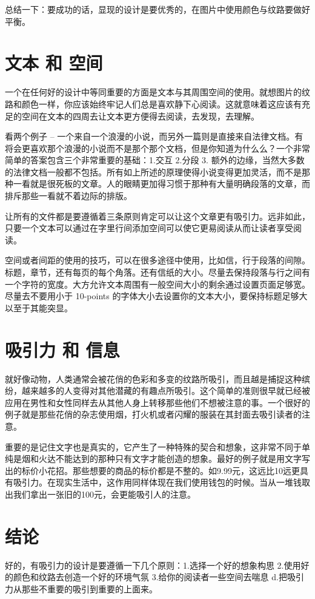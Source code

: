 总结一下：要成功的话，显现的设计是要优秀的，在图片中使用颜色与纹路要做好平衡。

\section*{文本 和 空间}

一个在任何好的设计中等同重要的方面是文本与其周围空间的使用。就想图片的纹路和颜色一样，你应该始终牢记人们总是喜欢静下心阅读。这就意味着这应该有充足的空间在文本的四周去让文本更方便得去阅读，去发现，去理解。

看两个例子 -- 一个来自一个浪漫的小说，而另外一篇则是直接来自法律文档。有将会更喜欢那个浪漫的小说而不是那个那个文档，但是你知道为什么么？一个非常简单的答案包含三个非常重要的基础：1.交互 2.分段 3. 额外的边缘，当然大多数的法律文档一般都不包括。所有如上所述的原理使得小说变得更加灵活，而不是那种一看就是很死板的文章。人的眼睛更加得习惯于那种有大量明确段落的文章，而排斥那些一看就不着边际的排版。

让所有的文件都是要遵循着三条原则肯定可以让这个文章更有吸引力。远非如此，只要一个文本可以通过在字里行间添加空间可以使它更易阅读从而让读者享受阅读。

空间或者间距的使用的技巧，可以在很多途径中使用，比如信，行于段落的间隙。标题，章节，还有每页的每个角落。还有信纸的大小。尽量去保持段落与行之间有一个字符的宽度。大方允许文本周围有一般空间大小的剩余通过设置页面足够宽。尽量去不要用小于 10-points 的字体大小去设置你的文本大小，要保持标题足够大以至于其能突显。

\section*{吸引力 和 信息}

就好像动物，人类通常会被花俏的色彩和多变的纹路所吸引，而且越是捕捉这种缤纷，越来越多的人变得对其他潜藏的有趣点所吸引。这个简单的准则很早就已经被应用在男性和女性同样去从其他人身上转移那些他们不想被注意的事。一个很好的例子就是那些花俏的杂志使用烟，打火机或者闪耀的服装在其封面去吸引读者的注意。

重要的是记住文字也是真实的，它产生了一种特殊的契合和想象，这非常不同于单纯是烟和火达不能达到的那种只有文字才能创造的想象。最好的例子就是用文字写出的标价小花招。那些想要的商品的标价都是不整的。如9.99元，这远比10远更具有吸引力。在现实生活中，这作用同样体现在我们使用钱包的时候。当从一堆钱取出我们拿出一张旧的100元，会更能吸引人的注意。

\section*{结论}

好的，有吸引力的设计是要遵循一下几个原则：1.选择一个好的想象构思 2.使用好的颜色和纹路去创造一个好的环境气氛 3.给你的阅读者一些空间去喘息 d.把吸引力从那些不重要的吸引到重要的上面来。

